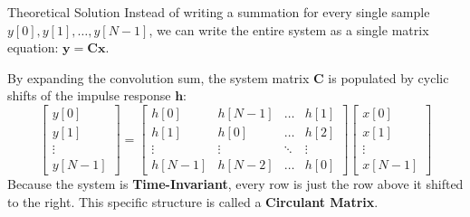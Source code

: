 \documentclass{beamer}
\begin{document}
\begin{frame}{Theoretical Solution}
Instead of writing a summation for every single sample $y[0], y[1], \dots, y[N-1]$, we can write the entire system as a single matrix equation: $\mathbf{y} = \mathbf{C}\mathbf{x}$.

By expanding the convolution sum, the system matrix $\mathbf{C}$ is populated by cyclic shifts of the impulse response $\mathbf{h}$:
\begin{equation}
\begin{bmatrix} y[0] \\ y[1] \\ \vdots \\ y[N-1] \end{bmatrix} = 
\begin{bmatrix} 
h[0] & h[N-1] & \dots & h[1] \\
h[1] & h[0] & \dots & h[2] \\
\vdots & \vdots & \ddots & \vdots \\
h[N-1] & h[N-2] & \dots & h[0]
\end{bmatrix}
\begin{bmatrix} x[0] \\ x[1] \\ \vdots \\ x[N-1] \end{bmatrix}
\end{equation}
Because the system is \textbf{Time-Invariant}, every row is just the row above it shifted to the right. This specific structure is called a \textbf{Circulant Matrix}.
\end{frame}
\end{document}
